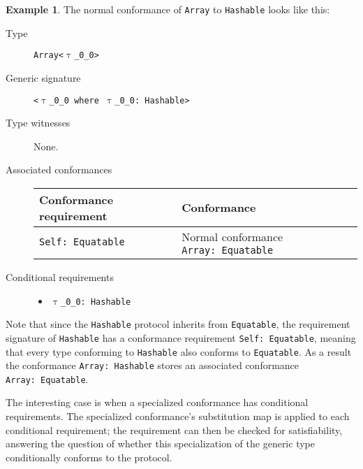 \documentclass[a4paper,headsepline,bibliography=totoc,toc=flat,fleqn,twoside=semi]{scrbook}
\theoremstyle{definition}
\theoremstyle{definition}
\newtheorem{example}{Example}[chapter]
\theoremstyle{definition}
\newcommand{\ttgp}[2]{\texttt{$\uptau$\_#1\_#2}}
\begin{document}
\begin{example}
The normal conformance of \texttt{Array} to \texttt{Hashable} looks like this:

\begin{description}
\item[Type] \texttt{Array<\ttgp{0}{0}>}
\item[Generic signature] \texttt{<\ttgp{0}{0} where \ttgp{0}{0}:\ Hashable>}

\item[Type witnesses] None.

\item[Associated conformances] \phantom{a}

\begin{tabular}{|l|l|}
\hline
Conformance requirement&Conformance\\
\hline
\hline
\texttt{Self:\ Equatable}&Normal conformance \texttt{Array:\ Equatable}\\
\hline
\end{tabular}

\item[Conditional requirements] \phantom{a}

\begin{itemize}
\item \texttt{\ttgp{0}{0}:\ Hashable}
\end{itemize}
\end{description}

Note that since the \texttt{Hashable} protocol inherits from \texttt{Equatable}, the requirement signature of \texttt{Hashable} has a conformance requirement \texttt{Self:\ Equatable}, meaning that every type conforming to \texttt{Hashable} also conforms to \texttt{Equatable}. As a result the conformance \texttt{Array:\ Hashable} stores an associated conformance \texttt{Array:\ Equatable}.
\end{example}

The interesting case is when a specialized conformance has conditional requirements. The specialized conformance's substitution map is applied to each conditional requirement; the requirement can then be checked for satisfiability, answering the question of whether this specialization of the generic type conditionally conforms to the protocol.
\end{document}
